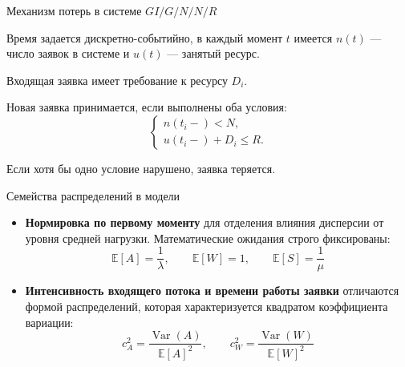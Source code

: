 \documentclass[aspectratio=169,12pt]{beamer}
\begin{document}
\begin{frame}{Механизм потерь в системе $GI/G/N/N/R$}

Время задается дискретно-событийно, в каждый момент $t$ имеется $n(t)$ — число заявок в системе и $u(t)$ — занятый ресурс.

Входящая заявка имеет требование к ресурсу $D_i$. 

\vspace{0.3cm}

Новая заявка принимается, если выполнены оба условия:
$$
\begin{cases}
n(t_i-) < N,\\
u(t_i-) + D_i \leq R.
\end{cases}
$$


Если хотя бы одно условие нарушено, заявка теряется.

\end{frame}

\begin{frame}{Семейства распределений в модели}



\begin{itemize}
  \item \textbf{Нормировка по первому моменту} для отделения влияния дисперсии от уровня средней нагрузки. Математические ожидания строго фиксированы:
  $$ \mathbb{E}[A] = \frac{1}{\lambda}, \qquad \mathbb{E}[W] = 1, \qquad \mathbb{E}[S] = \frac{1}{\mu} $$
  \item \textbf{Интенсивность входящего потока и времени работы заявки} отличаются формой распределений, которая характеризуется квадратом коэффициента вариации:
  $$ c_A^2 = \frac{\operatorname{Var}(A)}{\mathbb{E}[A]^2}, \qquad c_W^2 = \frac{\operatorname{Var}(W)}{\mathbb{E}[W]^2} $$
\end{itemize}



\end{frame}
\end{document}
